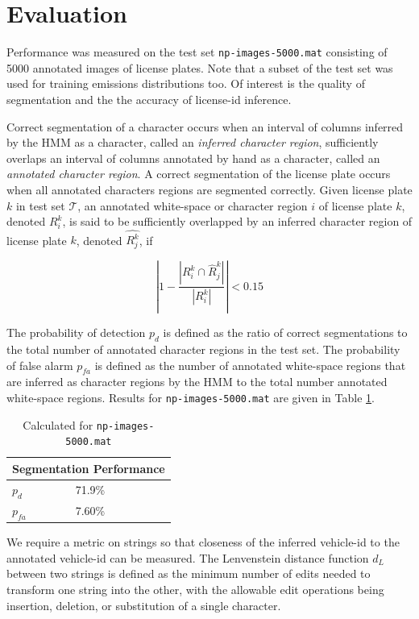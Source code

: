 \documentclass[a4paper,12pt]{article}
\newcommand{\test}{\ensuremath{\mathcal{T}}}
\begin{document}
\section{Evaluation}
Performance was measured on the test set \texttt{np-images-5000.mat}
consisting of 5000 annotated images of license plates.  Note that a
subset of the test set was used for training emissions distributions
too. Of interest is the quality of segmentation and the the accuracy of
license-id inference.

Correct segmentation of a character occurs when an interval of columns
inferred by the HMM as a character, called an \emph{inferred character
  region}, sufficiently overlaps an interval of columns annotated by
hand as a character, called an \emph{annotated character region}. A
correct segmentation of the license plate occurs when all annotated
characters regions are segmented correctly. Given license plate $k$ in
test set \test, an annotated white-space or character region $i$
of license plate $k$, denoted $R^k_i$, is said to be sufficiently
overlapped by an inferred character region of license plate $k$,
denoted $\hat{R^k_j}$, if

\[
\left|1-\frac{|R^k_i \cap \hat{R}^k_j|}{|R^k_i|}\right| < 0.15
\] 

The probability of detection $p_d$ is defined as the ratio of correct
segmentations to the total number of annotated character regions in
the test set. The probability of false alarm $p_{fa}$ is defined as
the number of annotated white-space regions that are inferred as
character regions by the HMM to the total number annotated white-space
regions. Results for \texttt{np-images-5000.mat} are given in Table
\ref{table:segmentation}.

\begin{table}[ht]
\begin{center}
\begin{tabular}{|l|l|}
  \hline
  \multicolumn{2}{|c|}{Segmentation Performance} \\
  \hline
  $p_d$ & 71.9\% \\
  $p_{fa}$ & 7.60\% \\
  \hline
\end{tabular}
\caption{Calculated for \texttt{np-images-5000.mat}}
\label{table:segmentation}
\end{center}
\end{table}

We require a metric on strings so that closeness of the inferred
vehicle-id to the annotated vehicle-id can be measured. The
Lenvenstein distance function $d_L$ between two strings is defined as
the minimum number of edits needed to transform one string into the
other, with the allowable edit operations being insertion, deletion,
or substitution of a single character.
\end{document}
